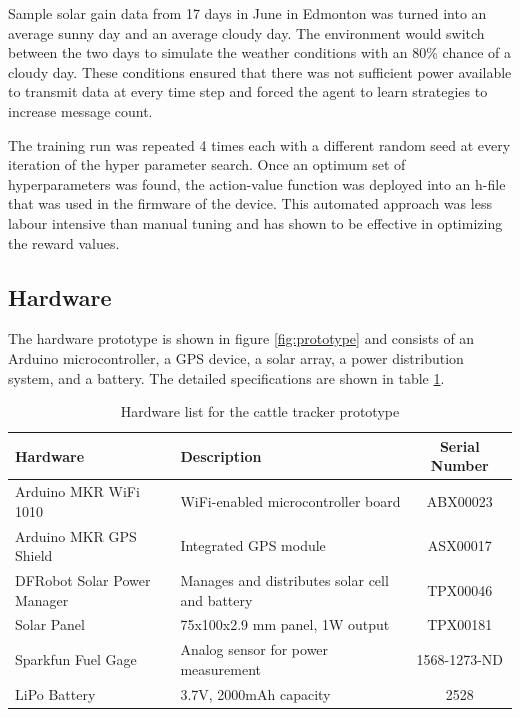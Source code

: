 \documentclass[10pt]{cai}
\begin{document}
Sample solar gain data from 17 days in June in Edmonton was turned into an average sunny day and an average cloudy day. 
The environment would switch between the two days to simulate the weather conditions with an 80\% chance of a cloudy day.
These conditions ensured that there was not sufficient power available to transmit data at every time step and forced the agent to learn strategies to increase message count.

The training run was repeated 4 times each with a different random seed at every iteration of the hyper parameter search.
Once an optimum set of hyperparameters was found, the action-value function was deployed into an h-file that was used in the firmware of the device.
This automated approach was less labour intensive than manual tuning and has shown to be effective in optimizing the reward values.

\subsection{Hardware}
The hardware prototype is shown in figure \ref{fig:prototype} and consists of an Arduino microcontroller, a GPS device, a solar array, a power distribution system, and a battery.
The detailed specifications are shown in table \ref{tab:hardware_inventory}.

\begin{table}[h]
  \centering
  \caption{Hardware list for the cattle tracker prototype}
  \begin{tabular}{l p{8cm} c}
      \toprule
      \textbf{Hardware} & \textbf{Description} & \textbf{Serial Number} \\
      \midrule
      Arduino MKR WiFi 1010 & WiFi-enabled microcontroller board & ABX00023 \\
      Arduino MKR GPS Shield & Integrated GPS module & ASX00017 \\
      DFRobot Solar Power Manager & Manages and distributes solar cell and battery & TPX00046 \\
      Solar Panel & 75x100x2.9 mm panel, 1W output & TPX00181 \\
      Sparkfun Fuel Gage & Analog sensor for power measurement & 1568-1273-ND \\
      LiPo Battery & 3.7V, 2000mAh capacity & 2528 \\
      \bottomrule
  \end{tabular}
  \label{tab:hardware_inventory}
\end{table}
\end{document}
